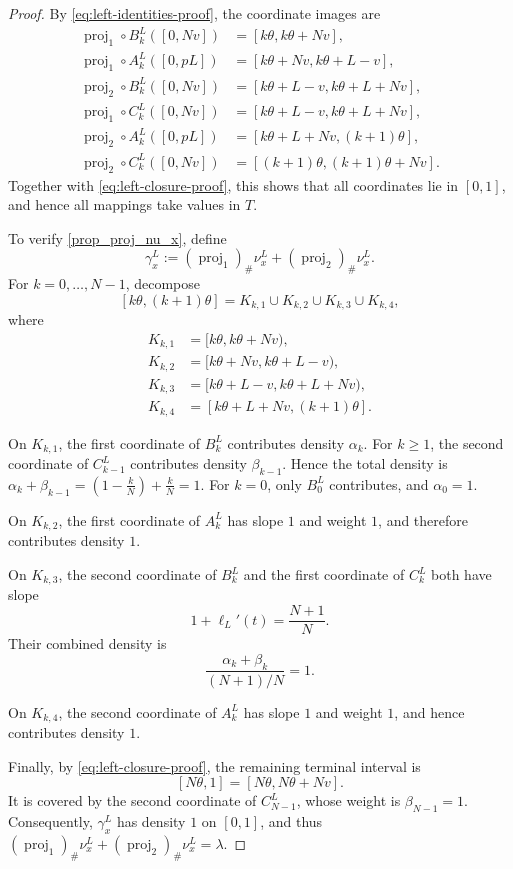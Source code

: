 \documentclass{article}
\newcommand{\lam}{\lambda}
\begin{document}
\begin{proof}
By \eqref{eq:left-identities-proof}, the coordinate images are
\[
\begin{aligned}
    \operatorname{proj}_1\circ B_k^L([0,Nv])
    &=[k\theta,k\theta+Nv],\\
    \operatorname{proj}_1\circ A_k^L([0,pL])
    &=[k\theta+Nv,k\theta+L-v],\\
    \operatorname{proj}_2\circ B_k^L([0,Nv])
    &=[k\theta+L-v,k\theta+L+Nv],\\
    \operatorname{proj}_1\circ C_k^L([0,Nv])
    &=[k\theta+L-v,k\theta+L+Nv],\\
    \operatorname{proj}_2\circ A_k^L([0,pL])
    &=[k\theta+L+Nv,(k+1)\theta],\\
    \operatorname{proj}_2\circ C_k^L([0,Nv])
    &=[(k+1)\theta,(k+1)\theta+Nv].
\end{aligned}
\]
Together with \eqref{eq:left-closure-proof}, this shows that all coordinates lie in \([0,1]\), and hence all mappings take values in \(T\).

To verify \eqref{prop_proj_nu_x}, define
\[
    \gamma_x^L
    :=
    (\operatorname{proj}_1)_\#\nu_x^L
    +
    (\operatorname{proj}_2)_\#\nu_x^L.
\]
For \(k=0,\ldots,N-1\), decompose
\[
    [k\theta,(k+1)\theta]
    =
    K_{k,1}\cup K_{k,2}\cup K_{k,3}\cup K_{k,4},
\]
where
\[
\begin{aligned}
    K_{k,1}&=[k\theta,k\theta+Nv),\\
    K_{k,2}&=[k\theta+Nv,k\theta+L-v),\\
    K_{k,3}&=[k\theta+L-v,k\theta+L+Nv),\\
    K_{k,4}&=[k\theta+L+Nv,(k+1)\theta].
\end{aligned}
\]

On \(K_{k,1}\), the first coordinate of \(B_k^L\) contributes density \(\alpha_k\).
For \(k\geq1\), the second coordinate of \(C_{k-1}^L\) contributes density \(\beta_{k-1}\).
Hence the total density is
\(
    \alpha_k+\beta_{k-1} = \left(1 - \frac k N \right) + \frac k N =1.
\)
For \(k=0\), only \(B_0^L\) contributes, and \(\alpha_0=1\).

\noindent On \(K_{k,2}\), the first coordinate of \(A_k^L\) has slope \(1\) and
weight \(1\), and therefore contributes density \(1\).

\noindent On \(K_{k,3}\), the second coordinate of \(B_k^L\) and the first
coordinate of \(C_k^L\) both have slope
\[
    1+\ell_L'(t)
    =
    \frac{N+1}{N}.
\]
Their combined density is
\[
    \frac{\alpha_k+\beta_k}{(N+1)/N}=1.
\]

\noindent On \(K_{k,4}\), the second coordinate of \(A_k^L\) has slope \(1\) and
weight \(1\), and hence contributes density \(1\).

\noindent Finally, by \eqref{eq:left-closure-proof}, the remaining terminal
interval is
\[
    [N\theta,1]=[N\theta,N\theta+Nv].
\]
It is covered by the second coordinate of \(C_{N-1}^L\), whose weight is
\(
    \beta_{N-1}=1.
\)
Consequently, \(\gamma_x^L\) has density \(1\) on \([0,1]\), and thus
\(
    (\operatorname{proj}_1)_\#\nu_x^L
    +
    (\operatorname{proj}_2)_\#\nu_x^L
    =
    \lam.
\)
\end{proof}
\end{document}
